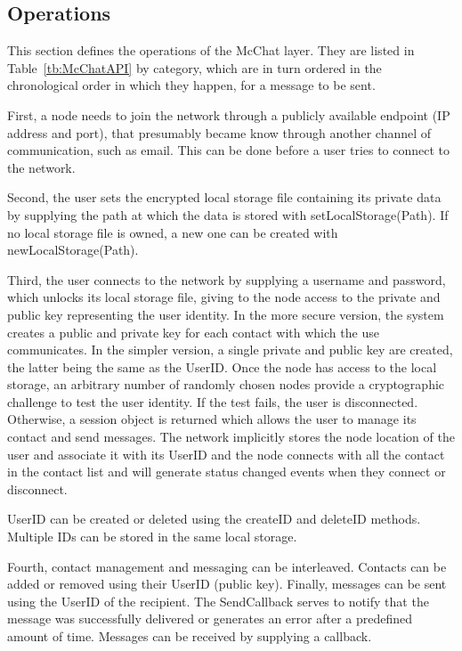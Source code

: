 \subsection{Operations}

This section defines the operations of the McChat layer. They are listed in Table~\ref{tb:McChatAPI} by category, which are in turn ordered in the chronological order in which they happen, for a message to be sent.  

First, a node needs to join the network through a publicly available endpoint (IP address and port), that presumably became know through another channel of communication, such as email. This can be done before a user tries to connect to the network.

Second, the user sets the encrypted local storage file containing its private data by supplying the path at which the data is stored with setLocalStorage(Path). If no local storage file is owned, a new one can be created with newLocalStorage(Path).

Third, the user connects to the network by supplying a username and password, which unlocks its local storage file, giving to the node access to the private and public key representing the user identity. In the more secure version, the system creates a public and private key for each contact with which the use communicates. In the simpler version, a single private and public key are created, the latter being the same as the UserID. Once the node has access to the local storage, an arbitrary number of randomly chosen nodes provide a cryptographic challenge to test the user identity. If the test fails, the user is disconnected. Otherwise, a session object is returned which allows the user to manage its contact and send messages. The network implicitly stores the node location of the user and associate it with its UserID and the node connects with all the contact in the contact list and will generate status changed events when they connect or disconnect.

UserID can be created or deleted using the createID and deleteID methods. Multiple IDs can be stored in the same local storage.

Fourth, contact management and messaging can be interleaved. Contacts can be added or removed using their UserID (public key). Finally, messages can be sent using the UserID of the recipient. The SendCallback serves to notify that the message was successfully delivered or generates an error after a predefined amount of time. Messages can be received by supplying a callback.

